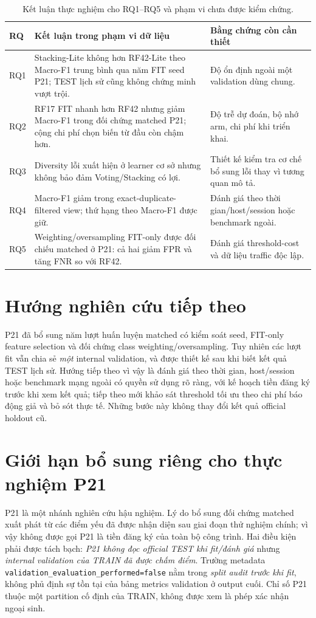 \begin{table}[htbp]
\centering
\small
\renewcommand{\arraystretch}{1.35}
\setlength{\tabcolsep}{6pt}
\caption{Kết luận thực nghiệm cho RQ1--RQ5 và phạm vi chưa được kiểm chứng.}
\label{tab:rq-evidence}
\begin{tabularx}{\linewidth}{p{0.9cm} X X}
\toprule
RQ & Kết luận trong phạm vi dữ liệu & Bằng chứng còn cần thiết\\
\midrule
RQ1 & Stacking-Lite không hơn RF42-Lite theo Macro-F1 trung bình qua năm FIT seed P21; TEST lịch sử cũng không chứng minh vượt trội. & Độ ổn định ngoài một validation dùng chung.\\
RQ2 & RF17 FIT nhanh hơn RF42 nhưng giảm Macro-F1 trong đối chứng matched P21; cộng chi phí chọn biến từ đầu còn chậm hơn. & Độ trễ dự đoán, bộ nhớ arm, chi phí khi triển khai.\\
RQ3 & Diversity lỗi xuất hiện ở learner cơ sở nhưng không bảo đảm Voting/Stacking có lợi. & Thiết kế kiểm tra cơ chế bổ sung lỗi thay vì tương quan mô tả.\\
RQ4 & Macro-F1 giảm trong exact-duplicate-filtered view; thứ hạng theo Macro-F1 được giữ. & Đánh giá theo thời gian/host/session hoặc benchmark ngoài.\\
RQ5 & Weighting/oversampling FIT-only được đối chiếu matched ở P21: cả hai giảm FPR và tăng FNR so với RF42. & Đánh giá threshold-cost và dữ liệu traffic độc lập.\\
\bottomrule
\end{tabularx}
\end{table}

\section{Hướng nghiên cứu tiếp theo}

P21 đã bổ sung năm lượt huấn luyện matched có kiểm soát seed, FIT-only feature selection và đối chứng class weighting/oversampling. Tuy nhiên các lượt fit vẫn chia sẻ \emph{một} internal validation, và được thiết kế sau khi biết kết quả TEST lịch sử. Hướng tiếp theo vì vậy là đánh giá theo thời gian, host/session hoặc benchmark mạng ngoài có quyền sử dụng rõ ràng, với kế hoạch tiền đăng ký trước khi xem kết quả; tiếp theo mới khảo sát threshold tối ưu theo chi phí báo động giả và bỏ sót thực tế. Những bước này không thay đổi kết quả official holdout cũ.


\section{Giới hạn bổ sung riêng cho thực nghiệm P21}
\label{sec:p21-validity}
P21 là một nhánh nghiên cứu hậu nghiệm. Lý do bổ sung đối chứng matched xuất phát từ các điểm yếu đã được nhận diện sau giai đoạn thử nghiệm chính; vì vậy không được gọi P21 là tiền đăng ký của toàn bộ công trình. Hai điều kiện phải được tách bạch: \emph{P21 không đọc official TEST khi fit/đánh giá} nhưng \emph{internal validation của TRAIN đã được chấm điểm}. Trường metadata \texttt{validation\_evaluation\_performed=false} nằm trong \emph{split audit trước khi fit}, không phủ định sự tồn tại của bảng metrics validation ở output cuối. Chỉ số P21 thuộc một partition cố định của TRAIN, không được xem là phép xác nhận ngoại sinh.

